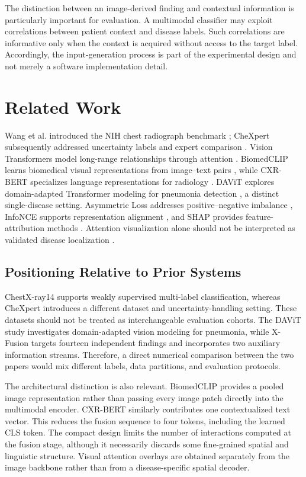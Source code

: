 \documentclass[conference,letterpaper]{IEEEtran}
\begin{document}
The distinction between an image-derived finding and contextual information is particularly important for evaluation. A multimodal classifier may exploit correlations between patient context and disease labels. Such correlations are informative only when the context is acquired without access to the target label. Accordingly, the input-generation process is part of the experimental design and not merely a software implementation detail.

\section{Related Work}
Wang et al. introduced the NIH chest radiograph benchmark \cite{wang2017}; CheXpert subsequently addressed uncertainty labels and expert comparison \cite{irvin2019}. Vision Transformers model long-range relationships through attention \cite{dosovitskiy2021,vaswani2017}. BiomedCLIP learns biomedical visual representations from image--text pairs \cite{biomedclip2023}, while CXR-BERT specializes language representations for radiology \cite{cxrbert2022}. DAViT explores domain-adapted Transformer modeling for pneumonia detection \cite{davit2025}, a distinct single-disease setting. Asymmetric Loss addresses positive--negative imbalance \cite{ridnik2021}, InfoNCE supports representation alignment \cite{oord2018}, and SHAP provides feature-attribution methods \cite{lundberg2017}. Attention visualization alone should not be interpreted as validated disease localization \cite{chefer2021}.

\subsection{Positioning Relative to Prior Systems}
ChestX-ray14 supports weakly supervised multi-label classification, whereas CheXpert introduces a different dataset and uncertainty-handling setting. These datasets should not be treated as interchangeable evaluation cohorts. The DAViT study investigates domain-adapted vision modeling for pneumonia, while X-Fusion targets fourteen independent findings and incorporates two auxiliary information streams. Therefore, a direct numerical comparison between the two papers would mix different labels, data partitions, and evaluation protocols.

The architectural distinction is also relevant. BiomedCLIP provides a pooled image representation rather than passing every image patch directly into the multimodal encoder. CXR-BERT similarly contributes one contextualized text vector. This reduces the fusion sequence to four tokens, including the learned CLS token. The compact design limits the number of interactions computed at the fusion stage, although it necessarily discards some fine-grained spatial and linguistic structure. Visual attention overlays are obtained separately from the image backbone rather than from a disease-specific spatial decoder.
\end{document}
